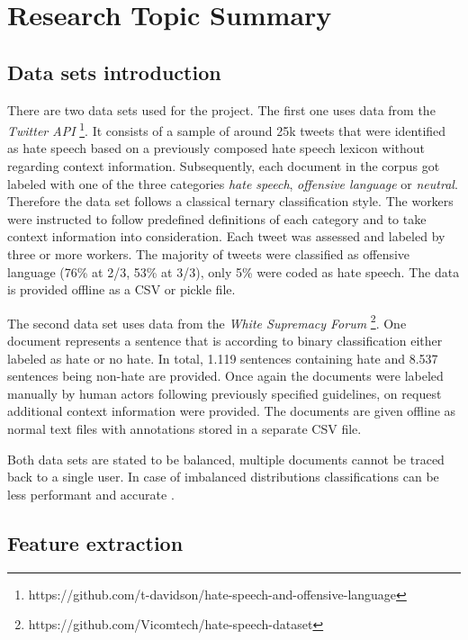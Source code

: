 \section{Research Topic Summary}
\label{section:research}

\subsection{Data sets introduction}

There are two data sets used for the project. The first one uses data from the \textit{Twitter API} \cite{ThomasDavidson.2020}\footnote{https://github.com/t-davidson/hate-speech-and-offensive-language}. It consists of a sample of around 25k tweets that were identified as hate speech based on a previously composed hate speech lexicon without regarding context information. Subsequently, each document in the corpus got labeled with one of the three categories \textit{hate speech}, \textit{offensive language} or \textit{neutral}. Therefore the data set follows a classical ternary clas\-si\-fi\-ca\-tion style. The workers were instructed to follow predefined definitions of each category and to take context information into consideration. Each tweet was assessed and labeled by three or more workers. The majority of tweets were classified as offensive language (76\% at 2/3, 53\% at 3/3), only 5\% were coded as hate speech. The data is provided offline as a CSV or pickle file. 

The second data set uses data from the \textit{White Supremacy Forum} \cite{OnadeGibert.2020}\footnote{https://github.com/Vicomtech/hate-speech-dataset}. One document represents a sentence that is according to binary classification either labeled as hate or no hate. In total, 1.119 sentences containing hate and 8.537 sentences being non-hate are provided. Once again the documents were labeled manually by human actors following previously specified guidelines, on request additional context information were provided. The documents are given offline as normal text files with annotations stored in a separate CSV file. 

Both data sets are stated to be balanced, multiple documents cannot be traced back to a single user. In case of imbalanced distributions classifications can be less performant and accurate \cite{Oriola.2020}.

\subsection{Feature extraction}

